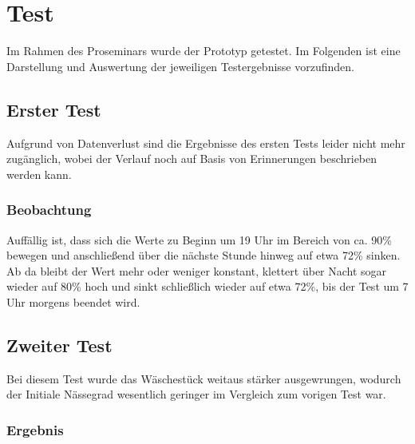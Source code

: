 \section{Test}
Im Rahmen des Proseminars wurde der Prototyp getestet. Im Folgenden ist eine Darstellung und Auswertung der jeweiligen Testergebnisse vorzufinden.

\subsection{Erster Test}
Aufgrund von Datenverlust sind die Ergebnisse des ersten Tests leider nicht mehr zugänglich, wobei der Verlauf noch auf Basis von Erinnerungen beschrieben werden kann.

\subsubsection{Beobachtung}
Auffällig ist, dass sich die Werte zu Beginn um 19 Uhr im Bereich von ca. 90\% bewegen und anschließend über die nächste Stunde hinweg auf etwa 72\% sinken. Ab da bleibt der Wert mehr oder weniger konstant, klettert über Nacht sogar wieder auf 80\% hoch und sinkt schließlich wieder auf etwa 72\%, bis der Test um 7 Uhr morgens beendet wird.

\subsection{Zweiter Test}
Bei diesem Test wurde das Wäschestück weitaus stärker ausgewrungen, wodurch der Initiale Nässegrad wesentlich geringer im Vergleich zum vorigen Test war.

\subsubsection{Ergebnis}


